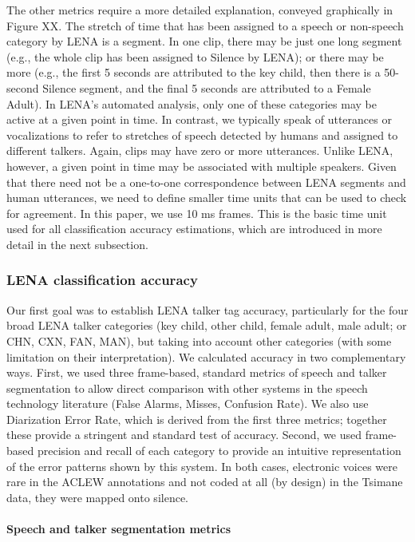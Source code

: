 \documentclass[english,floatsintext,man]{apa6}
\begin{document}
The other metrics require a more detailed explanation, conveyed
graphically in Figure XX. The stretch of time that has been assigned to
a speech or non-speech category by LENA is a segment. In one clip, there
may be just one long segment (e.g., the whole clip has been assigned to
Silence by LENA); or there may be more (e.g., the first 5 seconds are
attributed to the key child, then there is a 50-second Silence segment,
and the final 5 seconds are attributed to a Female Adult). In LENA's
automated analysis, only one of these categories may be active at a
given point in time. In contrast, we typically speak of utterances or
vocalizations to refer to stretches of speech detected by humans and
assigned to different talkers. Again, clips may have zero or more
utterances. Unlike LENA, however, a given point in time may be
associated with multiple speakers. Given that there need not be a
one-to-one correspondence between LENA segments and human utterances, we
need to define smaller time units that can be used to check for
agreement. In this paper, we use 10 ms frames. This is the basic time
unit used for all classification accuracy estimations, which are
introduced in more detail in the next subsection.

\subsubsection{LENA classification
accuracy}\label{lena-classification-accuracy}

Our first goal was to establish LENA talker tag accuracy, particularly
for the four broad LENA talker categories (key child, other child,
female adult, male adult; or CHN, CXN, FAN, MAN), but taking into
account other categories (with some limitation on their interpretation).
We calculated accuracy in two complementary ways. First, we used three
frame-based, standard metrics of speech and talker segmentation to allow
direct comparison with other systems in the speech technology literature
(False Alarms, Misses, Confusion Rate). We also use Diarization Error
Rate, which is derived from the first three metrics; together these
provide a stringent and standard test of accuracy. Second, we used
frame-based precision and recall of each category to provide an
intuitive representation of the error patterns shown by this system. In
both cases, electronic voices were rare in the ACLEW annotations and not
coded at all (by design) in the Tsimane data, they were mapped onto
silence.

\paragraph{Speech and talker segmentation
metrics}\label{speech-and-talker-segmentation-metrics}
\end{document}
